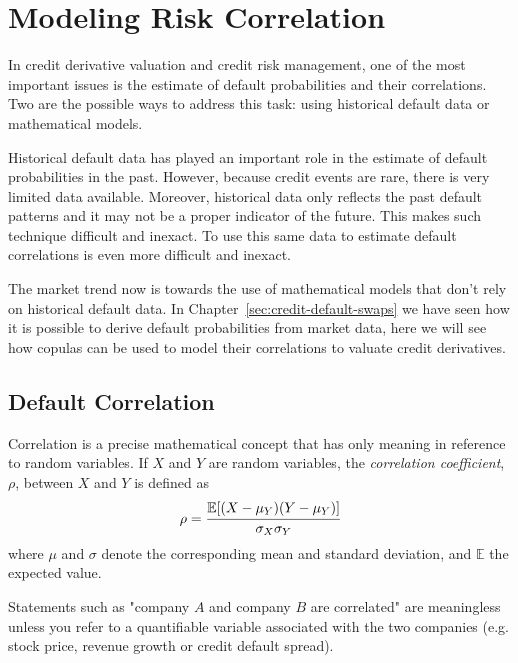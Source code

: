 \chapter{Modeling Risk Correlation}

In credit derivative valuation and credit risk management, one of the most important issues is the estimate of default probabilities and their correlations. Two are the possible ways to address this task: using historical default data or mathematical models.

Historical default data has played an important role in the estimate of default probabilities in the past. However, because credit events are rare, there is very limited data available. Moreover, historical data only reflects the past default patterns and it may not be a proper indicator of the future. This makes such technique difficult and inexact. To use this same data to estimate default correlations is even more difficult and inexact.

The market trend now is towards the use of mathematical models that don't rely on historical default data. In Chapter~\ref{sec:credit-default-swaps} we have seen how it is possible to derive default probabilities from market data, here we will see how copulas can be used to model their correlations to valuate credit derivatives. 

\section{Default Correlation}
\label{sec:default_correlation}
Correlation is a precise mathematical concept that has only meaning in reference to random variables. If $X$ and $Y$ are random variables, the \emph{correlation coefficient}, $\rho$, between $X$ and $Y$ is defined as
\begin{equation}
\rho = \cfrac{\mathbb{E}[(X-\mu_Y)(Y-\mu_Y)]}{\sigma_X \sigma_Y}
\label{eq:correlation_coefficient}
\end{equation}
where $\mu$ and $\sigma$ denote the corresponding mean and standard deviation, and $\mathbb{E}$ the expected value.

Statements such as "company $A$ and company $B$ are correlated" are meaningless unless you refer to a quantifiable variable associated with the two companies (e.g. stock price, revenue growth or credit default spread).


